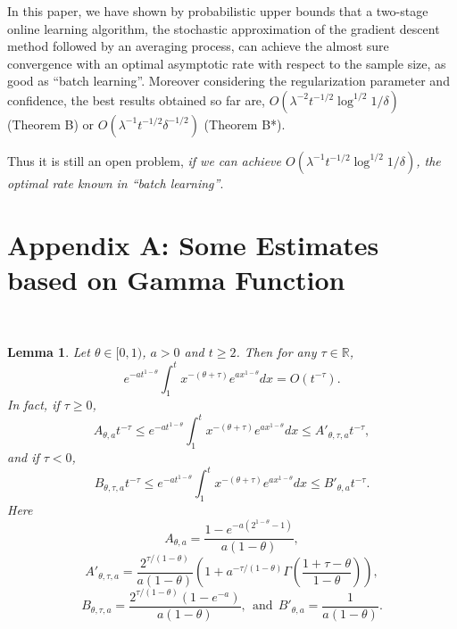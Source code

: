 \documentclass[twoside,twocolumn,journal]{IEEEtran}
\newtheorem{lem}[thm]{Lemma}
\def\R{{\mathbb R}}        %
\begin{document}
In this paper, we have shown by probabilistic upper bounds that a two-stage online learning algorithm,
the stochastic approximation of the gradient descent method followed by an averaging process, can achieve
the almost sure convergence with an optimal asymptotic rate with respect to the sample size, as good as ``batch learning''.
Moreover considering the regularization parameter and confidence, the best results obtained so far are,
$O(\lambda^{-2} t^{-1/2} \log^{1/2} 1/\delta)$ (Theorem B) or $O(\lambda^{-1} t^{-1/2} \delta^{-1/2})$ (Theorem B*).

Thus it is still an open problem, \emph{if we can achieve $O(\lambda^{-1} t^{-1/2} \log^{1/2}1/\delta)$, the optimal
rate known in ``batch learning''}.


\section*{Appendix A: Some Estimates based on Gamma Function}\

\renewcommand{\thesection}{A}
\setcounter{equation}{0}
\setcounter{thm}{0}
\renewcommand{\thethm}{A.\arabic{thm}}
\renewcommand{\theequation}{A-\arabic{equation}}

\begin{lem} \label{lem:key1} Let $\theta\in [0,1)$, $a>0$ and $t\geq 2$. Then for any $\tau\in \R$,
\[ e^{-a t^{1-\theta}} \int_1^t x^{-(\theta+\tau)} e^{a x^{1-\theta}} d x = O(t^{-\tau}). \]
In fact, if $\tau\geq 0$,
\[  A_{\theta,a} t^{-\tau} \leq e^{-a t^{1-\theta}} \int_1^t x^{-(\theta+\tau)} e^{a x^{1-\theta}} d x \leq A'_{\theta,\tau,a} t^{-\tau}, \]
and if $\tau<0$,
\[  B_{\theta,\tau,a} t^{-\tau} \leq e^{-a t^{1-\theta}} \int_1^t x^{-(\theta+\tau)} e^{a x^{1-\theta}} d x  \leq B'_{\theta,a}t^{-\tau}. \]
Here
\[ A_{\theta,a} =\frac{1-e^{-a(2^{1-\theta}-1)}}{a(1-\theta)} , \]
\[ A'_{\theta,\tau,a} =
\frac{2^{\tau/(1-\theta)}}{a(1-\theta)} \left(1+a^{-\tau/(1-\theta)} \Gamma \left( \frac{1+\tau-\theta}{1-\theta}\right)\right), \]
\[ B_{\theta,\tau,a} = \frac{2^{\tau/(1-\theta)}(1-e^{-a})}{a(1-\theta)},\ \ \mbox{and}\ \  B'_{\theta,a} = \frac{1}{  a(1-\theta)}. \]
\end{lem}
\end{document}
